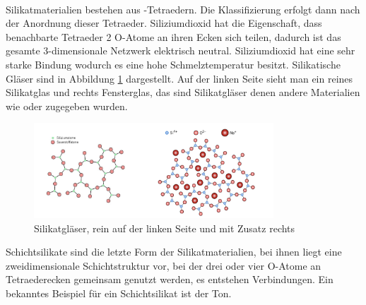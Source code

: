 \documentclass[11pt,a4paper]{article}
\numberwithin{equation}{section}
\numberwithin{figure}{section}
\begin{document}
\\
\begin{addmargin}[25pt]{0pt}
Silikatmaterialien bestehen aus -Tetraedern. Die Klassifizierung erfolgt dann nach der Anordnung dieser Tetraeder. Siliziumdioxid hat die Eigenschaft, dass benachbarte Tetraeder 2 O-Atome an ihren Ecken sich teilen, dadurch ist das gesamte 3-dimensionale Netzwerk elektrisch neutral. Siliziumdioxid hat eine sehr starke Bindung wodurch es eine hohe Schmelztemperatur besitzt. Silikatische Gläser sind in Abbildung \ref{fig:Silikatgläser} dargestellt. Auf der linken Seite sieht man ein reines Silikatglas und rechts Fensterglas, das sind Silikatgläser denen andere Materialien wie  oder  zugegeben wurden.
\begin{figure}[h]
    \centering
    \includegraphics[width = 0.8\textwidth]{images/Materialwissenschaften/Silikatische_glaser.jpeg}
    \caption{Silikatgläser, rein auf der linken Seite und mit Zusatz rechts}
    \label{fig:Silikatgläser}
\end{figure}
Schichtsilikate sind die letzte Form der Silikatmaterialien, bei ihnen liegt eine zweidimensionale Schichtstruktur vor, bei der drei oder vier O-Atome an Tetraederecken gemeinsam genutzt werden, es entstehen  Verbindungen. Ein bekanntes Beispiel für ein Schichtsilikat ist der Ton.\\
\end{addmargin}
\end{document}
